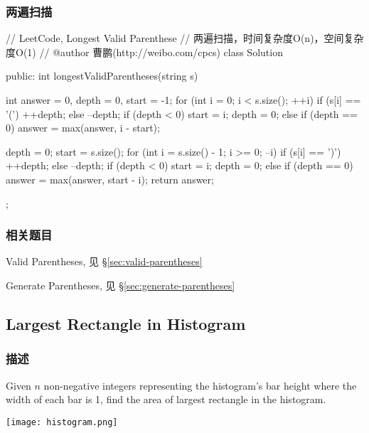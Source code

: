 \subsubsection{两遍扫描}
\begin{Code}
	// LeetCode, Longest Valid Parenthese
	// 两遍扫描，时间复杂度O(n)，空间复杂度O(1)
	// @author 曹鹏(http://weibo.com/cpcs)
	class Solution {
		public:
		int longestValidParentheses(string s) {
			int answer = 0, depth = 0, start = -1;
			for (int i = 0; i < s.size(); ++i) {
				if (s[i] == '(') {
					++depth;
				} else {
				--depth;
				if (depth < 0) {
					start = i;
					depth = 0;
				} else if (depth == 0) {
				answer = max(answer, i - start);
			}
		} 
	}
	
	depth = 0;
	start = s.size();
	for (int i = s.size() - 1; i >= 0; --i) {
		if (s[i] == ')') {
			++depth;
		} else {
		--depth;
		if (depth < 0) {
			start = i;
			depth = 0;
		} else if (depth == 0) {
		answer = max(answer, start - i);
	}
} 
}
return answer;
}
};
\end{Code}


\subsubsection{相关题目}
\begindot
\item Valid Parentheses, 见 \S \ref{sec:valid-parentheses}
\item Generate Parentheses, 见 \S \ref{sec:generate-parentheses}
\myenddot


\subsection{Largest Rectangle in Histogram} %
\label{sec:largest-rectangle-in-histogram}


\subsubsection{描述}
Given $n$ non-negative integers representing the histogram's bar height where the width of each bar is 1, find the area of largest rectangle in the histogram.

\begin{center}
	\texttt{[image: histogram.png]}\\
	\label{fig:histogram}
\end{center}

